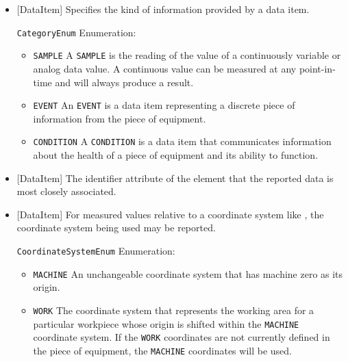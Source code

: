 \begin{itemize}

\item {}[DataItem] \newline Specifies the kind of information provided by a data item.

\texttt{CategoryEnum} Enumeration:

\begin{itemize}
\item \texttt{SAMPLE} \newline A \texttt{SAMPLE} is the reading of the value of a continuously variable or analog data value. A continuous value can be measured at any point-in-time and will always produce a result. 
\item \texttt{EVENT} \newline An \texttt{EVENT} is a data item representing a discrete piece of information from the piece of equipment. 
\item \texttt{CONDITION} \newline A \texttt{CONDITION} is a data item that communicates information about the health of a piece of equipment and its ability to function. 
\end{itemize}


\item {}[DataItem] \newline The identifier attribute of the  element that the reported data is most closely associated.

\item {}[DataItem] \newline For measured values relative to a coordinate system like , the coordinate system being used may be reported.

\texttt{CoordinateSystemEnum} Enumeration:

\begin{itemize}
\item \texttt{MACHINE} \newline An unchangeable coordinate system that has machine zero as its origin. 
\item \texttt{WORK} \newline The coordinate system that represents the working area for a particular workpiece whose origin is shifted within the \texttt{MACHINE} coordinate system. If the \texttt{WORK} coordinates are not currently defined in the piece of equipment, the \texttt{MACHINE}
coordinates will be used. 
\end{itemize}



\end{itemize}
